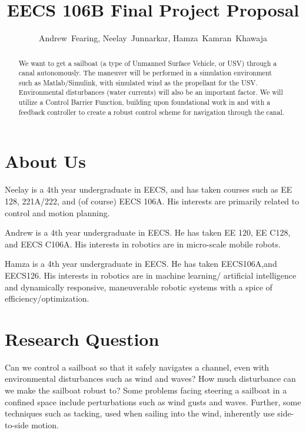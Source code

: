 \documentclass[conference]{IEEEtran}
\begin{document}
\title{EECS 106B Final Project Proposal}
\author{Andrew~Fearing, Neelay~Junnarkar,  Hamza~Kamran~Khawaja}
\maketitle


\begin{abstract}
We want to get a sailboat (a type of Unmanned Surface Vehicle, or USV) through a canal autonomously. The maneuver will be performed in a simulation environment such as Matlab/Simulink, with simulated wind as the propellant for the USV. Environmental disturbances (water currents) will also be an important factor. We will utilize a Control Barrier Function, building upon foundational work in \cite{Ames2017} and \cite{Ames2019} with a feedback controller to create a robust control scheme for navigation through the canal.

\end{abstract}


\section{About Us}
Neelay is a 4th year undergraduate in EECS, and has taken courses such as EE 128, 221A/222, and (of course) EECS 106A. His interests are primarily related to control and motion planning.

Andrew is a 4th year undergraduate in EECS. He has taken EE 120, EE C128, and EECS C106A. His interests in robotics are in micro-scale mobile robots.

Hamza is a 4th year undergraduate in EECS. He has taken EECS106A,and EECS126. His interests in robotics are in machine learning/ artificial intelligence and dynamically responsive, maneuverable robotic systems with a spice of efficiency/optimization.

\section{Research Question}
Can we control a sailboat so that it safely navigates a channel, even with environmental disturbances such as wind and waves? How much disturbance can we make the sailboat robust to?
Some problems facing steering a sailboat in a confined space include perturbations such as wind gusts and waves. Further, some techniques such as tacking, used when sailing into the wind, inherently use side-to-side motion.
\end{document}
